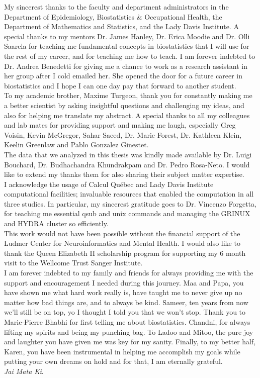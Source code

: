 \documentclass[12pt,letterpaper]{report}
\begin{document}
\begin{romanPagenumber}{2}
{My sincerest thanks to the faculty and department administrators in the Department of Epidemiology, Biostatistics \& Occupational Health, the Department of Mathematics and Statistics, and the Lady Davis Institute. A special thanks to my mentors Dr. James Hanley, Dr. Erica Moodie and Dr. Olli Saarela for teaching me fundamental concepts in biostatistics that I will use for the rest of my career, and for teaching me how to teach. I am forever indebted to Dr. Andrea Benedetti for giving me a chance to work as a research assistant in her group after I cold emailed her. She opened the door for a future career in biostatistics and I hope I can one day pay that forward to another student. \\
To my academic brother, Maxime Turgeon, thank you for constantly making me a better scientist by asking insightful questions and challenging my ideas, and also for helping me translate my abstract. 
A special thanks to all my colleagues and lab mates for providing support and making me laugh, especially Greg Voisin, Kevin McGregor, Sahar Saeed, Dr. Marie Forest, Dr. Kathleen Klein, Keelin Greenlaw and Pablo Gonzalez Ginestet.\\
The data that we analyzed in this thesis was kindly made available by Dr.
Luigi Bouchard, Dr. Budhachandra Khundrakpam and Dr. Pedro Rosa-Neto. I would like to extend my thanks them for also sharing their subject matter expertise.\\
I acknowledge the usage of Calcul Qu\'{e}bec and Lady Davis Institute computational facilities; invaluable resources that enabled the computation in all three studies. In particular, my sincerest gratitude goes to Dr. Vincenzo Forgetta, for teaching me essential qsub and unix commands and managing the GRINUX and HYDRA cluster so efficiently.\\
This work would not have been possible without the financial support of the Ludmer Center for Neuroinformatics and Mental Health. I would also like to thank the Queen Elizabeth II scholarship program for supporting my 6 month visit to the Wellcome Trust Sanger Institute. \\
I am forever indebted to my family and friends for always providing me with the support and encouragement I needed during this journey. Maa and Papa, you have shown me what hard work really is, have taught me to never give up no matter how bad things are, and to always be kind. Sameer, ten years from now we'll still be on top, yo I thought I told you that we won't stop. Thank you to Marie-Pierre Bhabhi for first telling me about biostatistics. Chandni, for always lifting my spirits and being my punching bag. To Ladoo and Mitoo, the pure joy and laughter you have given me was key for my sanity. Finally, to my better half, Karen, you have been instrumental in helping me accomplish my goals while putting your own dreams on hold and for that, I am eternally grateful. \\ \textit{Jai Mata Ki}.  
}
	\Acknowledge	


\end{romanPagenumber}
\end{document}
